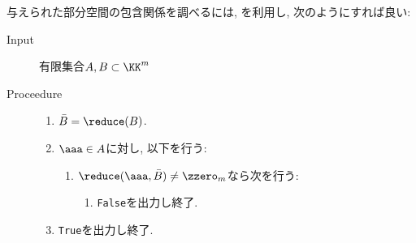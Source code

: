 与えられた部分空間の包含関係を調べるには,
を利用し,
次のようにすれば良い:
\begin{algorithm}\makebox{}
\begin{description}
\item[Input]
 有限集合$A, B\subset \KK^m$ 
\item[Proceedure]\makebox{}
  \begin{enumerate}
  \item $\bar B=\reduce(B)$.
  \item $\aaa\in A$に対し, 以下を行う:
    \begin{enumerate}
    \item $\reduce(\aaa,\bar B)\neq\zzero_m$なら次を行う:
      \begin{enumerate}
      \item \texttt{False}を出力し終了.
      \end{enumerate}
    \end{enumerate}
  \item \texttt{True}を出力し終了.
  \end{enumerate}
\end{description}
\end{algorithm}

